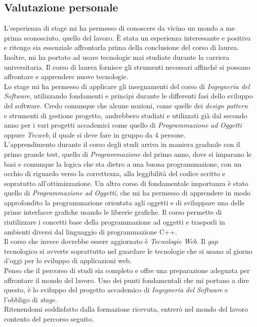 \subsection{Valutazione personale}
L'esperienza di stage mi ha permesso di conoscere da vicino un mondo a me prima sconosciuto, quello del lavoro. È stata un esperienza interessante e positiva e ritengo sia essenziale affrontarla prima della conclusione del corso di laurea. Inoltre, mi ha portato ad usare tecnologie mai studiate durante la carriera universitaria. Il corso di laurea fornisce gli strumenti necessari affinché si possano affrontare e apprendere nuove tecnologie. \\
Lo stage mi ha permesso di applicare gli insegnamenti del corso di \textit{Ingegneria del Software}, utilizzando fondamenti e principi durante le differenti fasi dello sviluppo del software. Credo comunque che alcune nozioni, come quelle dei \textit{design pattern} e strumenti di gestione progetto, andrebbero studiati e utilizzati già dal secondo anno per i vari progetti accademici come quello di \textit{Programmazione ad Oggetti} oppure \textit{Tecweb}, il quale si deve fare in gruppo da 4 persone.
\\
L'apprendimento durante il corso degli studi arriva in maniera graduale con il primo grande test, quello di \textit{Programmazione} del primo anno, dove si imparano le basi e comunque la logica che sta dietro a una buona programmazione, con un occhio di riguardo verso la correttezza, alla leggibilità del codice scritto e sopratutto all'ottimizzazione. 
Un altro corso di fondamentale importanza è stato quello di \textit{Programmazione ad Oggetti}, che mi ha permesso di apprendere in modo approfondito la programmazione orientata agli oggetti e di sviluppare una delle prime interfacce grafiche usando le librerie grafiche. Il corso permette di riutilizzare i concetti base della programmazione ad oggetti e trasporli in ambienti diversi dal linguaggio di programmazione C++.\\
Il corso che invece dovrebbe essere aggiornato è \textit{Tecnologie Web}. Il \textit{gap} tecnologico si avverte soprattutto nel guardare le tecnologie che si usano al giorno d'oggi per lo sviluppo di applicazioni web.\\
Penso che il percorso di studi sia completo e offre una preparazione adeguata per affrontare il mondo del lavoro. Uno dei punti fondamentali che mi portano a dire questo, è lo sviluppo del progetto accademico di \textit{Ingegneria del Software} e l'obbligo di \textit{stage}.\\
Ritenendomi soddisfatto dalla formazione ricevuta, entrerò nel mondo del lavoro contento del percorso seguito.
